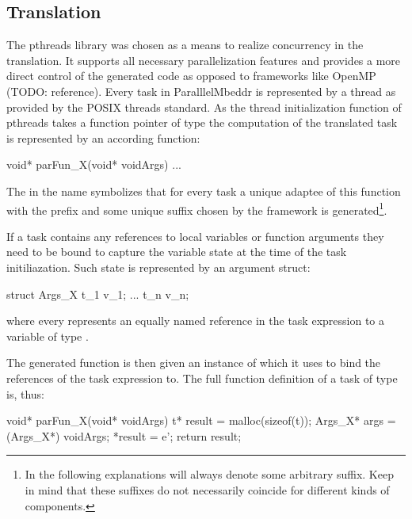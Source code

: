 \subsection{Translation}
The pthreads library was chosen as a means to realize concurrency in the translation. It supports all necessary parallelization features and provides a more direct control of the generated code as opposed to frameworks like OpenMP (TODO: reference). Every task in ParalllelMbeddr is represented by a thread as provided by the POSIX threads standard. As the thread initialization function of pthreads takes a function pointer of type  the computation of the translated task is represented by an according function:
\begin{ccode}
void* parFun_X(void* voidArgs) {...}
\end{ccode}

The  in the name symbolizes that for every task a unique adaptee of this function with the prefix  and some unique suffix chosen by the framework is generated\footnote{In the following explanations  will always denote some arbitrary suffix. Keep in mind that these suffixes do not necessarily coincide for different kinds of components.}.

If a task contains any references to local variables or function arguments they need to be bound to capture the variable state at the time of the task initiliazation. Such state is represented by an argument struct:

\begin{ccode}
struct Args_X {
  t_1 v_1;
  ...
  t_n v_n;
}
\end{ccode}

where every  represents an equally named reference in the task expression to a variable of type .

The generated function  is then given an instance of  which it uses to bind the references of the task expression to. The full function definition of a task  of type  is, thus:

\begin{ccode}
void* parFun_X(void* voidArgs) {
  t* result = malloc(sizeof(t));
  Args_X* args = (Args_X*) voidArgs;
  *result = e';
  return result;
}
\end{ccode}

